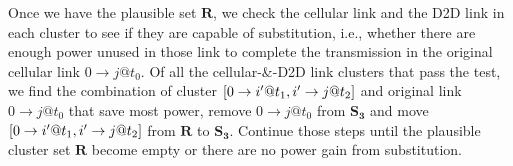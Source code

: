 \documentclass{ieeeaccess}
\begin{document}
Once we have the plausible set $\mathbf{R}$, we check the cellular link and the D2D link in each cluster to see if they are capable of substitution, i.e., whether there are enough power unused in those link to complete the transmission in the original cellular link $0 \to j @{t_0}$. Of all the cellular-\&-D2D link clusters that pass the test, we find the combination of cluster $\left[ {{\rm{0}} \to i'@{t_1},i' \to j@{t_2}} \right]$ and original link $0 \to j @{t_0}$ that save most power, remove $0 \to j @{t_0}$ from ${{\mathbf{S}}_{\mathbf{3}}}$ and move $\left[ {{\rm{0}} \to i'@{t_1},i' \to j@{t_2}} \right]$ from $\mathbf{R}$ to ${{\mathbf{S}}_{\mathbf{3}}}$. Continue those steps until the plausible cluster set $\mathbf{R}$ become empty or there are no power gain from substitution.
\end{document}
